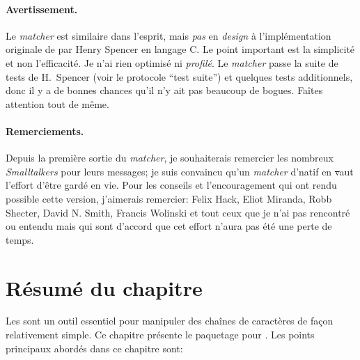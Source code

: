\documentclass[a4paper,10pt,twoside]{book}
\begin{document}
{\paragraph{Avertissement.} Le \emph{matcher} est similaire dans
l'esprit, mais \emph{pas} en \emph{design}
à l'implémentation originale de \expreg par Henry Spencer en langage
C. Le point important est la simplicité et non l'efficacité. Je n'ai
rien optimisé ni \emph{profilé}.
Le \emph{matcher} passe la suite de tests de H.~Spencer (voir le
protocole ``test suite'') et quelques tests additionnels, donc il y a
de bonnes chances qu'il n'y ait pas beaucoup de bogues. Faîtes
attention tout de même. 

\paragraph{Remerciements.}
Depuis la première sortie du \emph{matcher}, je souhaiterais remercier
les nombreux \emph{Smalltalkers} pour leurs messages; je suis
convaincu qu'un \emph{matcher} d'\expreg natif en \st vaut l'effort 
d'être gardé en vie. Pour les conseils et l'encouragement qui ont rendu
possible cette version, j'aimerais remercier:
Felix Hack, Eliot Miranda, Robb Shecter, David N. Smith, Francis
Wolinski et tout ceux que je n'ai pas rencontré ou entendu mais qui sont
d'accord que cet effort n'aura pas été une perte de temps.

\section{Résumé du chapitre}

Les \expregs sont un outil essentiel pour manipuler des chaînes de
caractères de façon relativement simple.
Ce chapitre présente le paquetage \pkgregex pour \pharo. Les points
principaux abordés dans ce chapitre sont:

}
\end{document}
